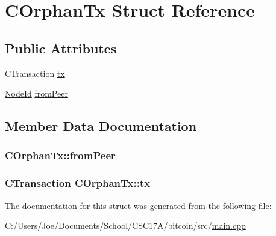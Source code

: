 \hypertarget{struct_c_orphan_tx}{}\section{C\+Orphan\+Tx Struct Reference}
\label{struct_c_orphan_tx}
\subsection*{Public Attributes}
\begin{DoxyCompactItemize}
\item 
C\+Transaction \hyperlink{struct_c_orphan_tx_aa797568f3a1168e96d3c51601eda5fdc}{tx}
\item 
\hyperlink{net_8h_a954d746a58632565552615fd0a4ee660}{Node\+Id} \hyperlink{struct_c_orphan_tx_a06fa313a474fd4e6d0ed20bda7cbe69c}{from\+Peer}
\end{DoxyCompactItemize}


\subsection{Member Data Documentation}
\hypertarget{struct_c_orphan_tx_a06fa313a474fd4e6d0ed20bda7cbe69c}{}
\subsubsection[{from\+Peer}]{ C\+Orphan\+Tx\+::from\+Peer}\label{struct_c_orphan_tx_a06fa313a474fd4e6d0ed20bda7cbe69c}
\hypertarget{struct_c_orphan_tx_aa797568f3a1168e96d3c51601eda5fdc}{}
\subsubsection[{tx}]{\setlength{\rightskip}{0pt plus 5cm}C\+Transaction C\+Orphan\+Tx\+::tx}\label{struct_c_orphan_tx_aa797568f3a1168e96d3c51601eda5fdc}


The documentation for this struct was generated from the following file\+:\begin{DoxyCompactItemize}
\item 
C\+:/\+Users/\+Joe/\+Documents/\+School/\+C\+S\+C17\+A/bitcoin/src/\hyperlink{main_8cpp}{main.\+cpp}\end{DoxyCompactItemize}
